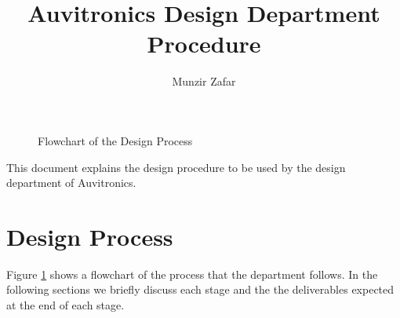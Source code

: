 \documentclass[a4paper,10pt]{article}
\title{Auvitronics Design Department Procedure}
\author{Munzir Zafar}
\begin{document}
\maketitle

\begin{figure}[!ht]
\centering {}
\caption{Flowchart of the Design Process}
\label{fig:fig1} 
\end{figure}

\newpage
This document explains the design procedure to be used by the design department of Auvitronics. 

\section{Design Process}
Figure \ref{fig:fig1} shows a flowchart of the process that the department follows. In the following sections 
we briefly discuss each stage and the the deliverables expected at the end of each stage.
\end{document}

